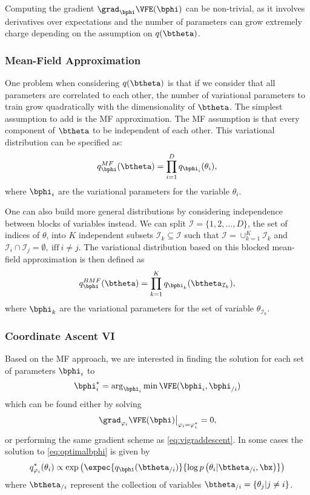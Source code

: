 Computing the gradient $\grad_{\bphi}\VFE(\bphi)$ can be non-trivial, as it involves derivatives over expectations and the number of parameters can grow extremely charge depending on the assumption on $q(\btheta)$.

\subsubsection{Mean-Field Approximation}

One problem when considering $q(\btheta)$ is that if we consider that all parameters are correlated to each other, the number of variational parameters to train grow quadratically with the dimensionality of $\btheta$.
The simplest assumption to add is the \ac{MF} approximation.
The \ac{MF} assumption is that every component of $\btheta$ to be independent of each other.
This variational distribution can be specified as:
\begin{align}
q^{MF}_{\bphi}(\btheta) = \prod_{i=1}^D q_{\bphi_i}(\theta_i),
\end{align}
where $\bphi_i$ are the variational parameters for the variable $\theta_i$.

One can also build more general distributions by considering independence between blocks of variables instead.
We can split $\mathcal{I}=\{1,2,\ldots,D\}$, the set of indices of $\theta$, into $K$ independent subsets $\mathcal{I}_k \subseteq \mathcal{I}$ such that  $\mathcal{I} = \cup_{k=1}^K \mathcal{I}_{k}$ and $\mathcal{I}_i \cap \mathcal{I}_j=\emptyset,~\mathrm{iff}~i \neq j$.
The variational distribution based on this blocked mean-field approximation is then defined as
\begin{align}
    q^{BMF}_{\bphi}(\btheta) = \prod_{k=1}^K q_{\bphi_k}(\btheta_{\mathcal{I}_k}),
\end{align}
where $\bphi_k$ are the variational parameters for the set of variable $\theta_{\mathcal{I}_k}$.
\subsubsection{Coordinate Ascent VI}

Based on the \ac{MF} approach, we are interested in finding the solution for each set of parameters $\bphi_i$ to
\begin{align}
    \bphi_i^* = \arg_{\bphi_i}\min \VFE(\bphi_i, \bphi_{/i})
    \label{eq:optimalbphi}
\end{align}
which can be found either by solving
\begin{align}
\left.\grad_{\varphi_i}\VFE(\bphi)\right\vert_{\varphi_i=\varphi_i^*} = 0,
\end{align}
or performing the same gradient scheme as \eqref{eq:vigraddescent}.
In some cases the solution to \eqref{eq:optimalbphi} is given by
\begin{align}
q_{\varphi_i}^*(\theta_i) \propto \exp\left(\expec{q_{\bphi}(\btheta_{/i})}{\log p\left(\theta_i|\btheta_{/i},\bx\right)}\right)
\end{align}
where $\btheta_{/i}$ represent the collection of variables $\btheta_{/i} = \{\theta_j | j \neq i\}$.

